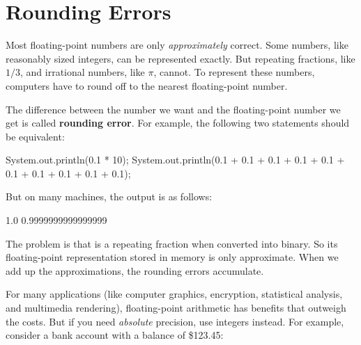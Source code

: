 \section{Rounding Errors}
\label{rounderr}


Most floating-point numbers are only {\em approximately} correct.
Some numbers, like reasonably sized integers, can be represented exactly.
But repeating fractions, like $1/3$, and irrational numbers, like $\pi$, cannot.
To represent these numbers, computers have to round off to the nearest floating-point number.



The difference between the number we want and the floating-point number we get is called {\bf rounding error}.
For example, the following two statements should be equivalent:

\begin{code}
System.out.println(0.1 * 10);
System.out.println(0.1 + 0.1 + 0.1 + 0.1 + 0.1
                 + 0.1 + 0.1 + 0.1 + 0.1 + 0.1);
\end{code}

But on many machines, the output is as follows:

\begin{stdout}
1.0
0.9999999999999999
\end{stdout}

The problem is that  is a repeating fraction when converted into binary.
So its floating-point representation stored in memory is only approximate.
When we add up the approximations, the rounding errors accumulate.

For many applications (like computer graphics, encryption, statistical analysis, and multimedia rendering), floating-point arithmetic has benefits that outweigh the costs.
But if you need {\em absolute} precision, use integers instead.
For example, consider a bank account with a balance of \$123.45:

